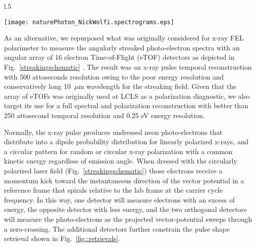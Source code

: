 \begin{wrapfigure}[18]{l}{.5\linewidth}
\vspace{-\baselineskip}
\centerline{\texttt{[image: naturePhoton\_NickWolfi.spectrograms.eps]}}
\vspace{-1\baselineskip}
\caption{\label{fig::retrievals}X-ray pulse shape retrievals reproduced from Ref.~\cite{Nick2018}.}
\end{wrapfigure}
As an alternative, we repurposed what was originally considered for x-ray FEL polarimeter \cite{Markus2014,Allaria2014,Mazza2014,Lutman2016} to measure the angularly streaked photo-electron spectra with an angular array of 16 electron Time-of-Flight (eTOF) detectors as depicted in Fig.~\ref{streakingschematic} \cite{Nick2018}.
The result was an x-ray pulse temporal reconstruction with 500 attoseconds resolution owing to the poor energy resolution and conservatively long 10~$\mu$m wavelength for the streaking field. 
Given that the array of eTOFs was originally used at LCLS as a polarization diagnostic, we also target its use for a full spectral and polarization reconstruction with better than 250 attosecond temporal resolution and 0.25 eV energy resolution.

Normally, the x-ray pulse produces undressed neon photo-electrons that distribute into a dipole probability distribution for linearly polarized x-rays, and a circular pattern for random or circular x-ray polarization with a common kinetic energy regardless of emission angle.
When dressed with the circularly polarized laser field (Fig.~\ref{streakingschematic}) those electrons receive a momentum kick toward the instantaneous direction of the vector potential in a reference frame that spirals relative to the lab frame at the carrier cycle frequency.
In this way, one detector will measure electrons with an excess of energy, the opposite detector with less energy, and the two orthogonal detectors will measure the photo-electrons as the projected vector-potential sweeps through a zero-crossing.
The additional detectors further constrain the pulse shape retrieval shown in Fig.~\ref{fig::retrievals}.

